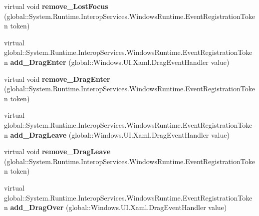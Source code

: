 \begin{DoxyCompactItemize}
\item 
\mbox{\label{class_windows_1_1_u_i_1_1_xaml_1_1_u_i_element_aea3d40de4ee0bc713def8655f7f7ccd3}} 
virtual void {\bfseries remove\+\_\+\+Lost\+Focus} (global\+::\+System.\+Runtime.\+Interop\+Services.\+Windows\+Runtime.\+Event\+Registration\+Token token)
\item 
\mbox{\label{class_windows_1_1_u_i_1_1_xaml_1_1_u_i_element_a84e265c30f9ba7acab529bdfc0475eb7}} 
virtual global\+::\+System.\+Runtime.\+Interop\+Services.\+Windows\+Runtime.\+Event\+Registration\+Token {\bfseries add\+\_\+\+Drag\+Enter} (global\+::\+Windows.\+U\+I.\+Xaml.\+Drag\+Event\+Handler value)
\item 
\mbox{\label{class_windows_1_1_u_i_1_1_xaml_1_1_u_i_element_ab1b0c333cb61061297f04ff3341ed26d}} 
virtual void {\bfseries remove\+\_\+\+Drag\+Enter} (global\+::\+System.\+Runtime.\+Interop\+Services.\+Windows\+Runtime.\+Event\+Registration\+Token token)
\item 
\mbox{\label{class_windows_1_1_u_i_1_1_xaml_1_1_u_i_element_a09d1a9af723d25f04884ff5c295f0e44}} 
virtual global\+::\+System.\+Runtime.\+Interop\+Services.\+Windows\+Runtime.\+Event\+Registration\+Token {\bfseries add\+\_\+\+Drag\+Leave} (global\+::\+Windows.\+U\+I.\+Xaml.\+Drag\+Event\+Handler value)
\item 
\mbox{\label{class_windows_1_1_u_i_1_1_xaml_1_1_u_i_element_ad92e1bfdb1f8c87efd732bbc3fb71ab9}} 
virtual void {\bfseries remove\+\_\+\+Drag\+Leave} (global\+::\+System.\+Runtime.\+Interop\+Services.\+Windows\+Runtime.\+Event\+Registration\+Token token)
\item 
\mbox{\label{class_windows_1_1_u_i_1_1_xaml_1_1_u_i_element_ab912e89cec08f1d3a71ac840cb1a7964}} 
virtual global\+::\+System.\+Runtime.\+Interop\+Services.\+Windows\+Runtime.\+Event\+Registration\+Token {\bfseries add\+\_\+\+Drag\+Over} (global\+::\+Windows.\+U\+I.\+Xaml.\+Drag\+Event\+Handler value)
\item 
\mbox{\label{class_windows_1_1_u_i_1_1_xaml_1_1_u_i_element_a42cb32bddd90c0040c369b5317c8c3c4}} 

\end{DoxyCompactItemize}

